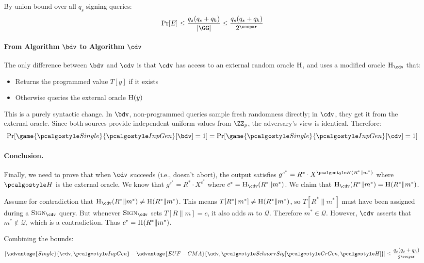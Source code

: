 \begin{mysolution}
  By union bound over all $q_s$ signing queries:
  \[
    \Pr[E] \leq \frac{q_s(q_s + q_h)}{|\GG|} \leq \frac{q_s(q_s + q_h)}{2^\secpar}
  \]

  \paragraph{From Algorithm $\bdv$ to Algorithm $\cdv$}
  The only difference between $\bdv$ and $\cdv$ is that $\cdv$ has access to an external random oracle ${\normalfont\textsc{H}}$, and uses a modified oracle $\pcoracle{H}_{\cdv}$ that:
  \begin{itemize}
    \item Returns the programmed value $T[y]$ if it exists
    \item Otherwise queries the external oracle ${\normalfont\textsc{H}}(y)$
  \end{itemize}

  This is a purely syntactic change. In $\bdv$, non-programmed queries sample fresh randomness directly; in $\cdv$, they get it from the external oracle.
  Since both sources provide independent uniform values from $\ZZ_p$, the adversary's view is identical. Therefore:
  \[
    \Pr[\game{\algo{Single}}{\algo{InpGen}}[\bdv] = 1] = \Pr[\game{\algo{Single}}{\algo{InpGen}}[\cdv] = 1]
  \]

  \paragraph{Conclusion.}
  Finally, we need to prove that when $\cdv$ succeeds (i.e., doesn't abort), the output satisfies $g^{s^*} = R^* \cdot X^{\algo{H}(R^* \| m^*)}$ where $\algo{H}$ is the external oracle. We know that $g^{s^*} = R^* \cdot X^{c^*}$ where $c^* = \pcoracle{H}_{\cdv}(R^* \| m^*)$. We claim that $\pcoracle{H}_{\cdv}(R^* \| m^*) = \pcoracle{H}(R^* \| m^*)$.
  
  Assume for contradiction that $\pcoracle{H}_{\cdv}(R^* \| m^*) \neq \pcoracle{H}(R^* \| m^*)$. This means $T[R^* \| m^*] \neq {\normalfont\textsc{H}}(R^* \| m^*)$, so $T[R^* \| m^*]$ must have been assigned during a $\pcoracle{Sign}_{\cdv}$ query. But whenever $\pcoracle{Sign}_{\cdv}$ sets $T[R \| m] = c$, it also adds $m$ to $\mathcal{Q}$. Therefore $m^* \in \mathcal{Q}$. However, $\cdv$ asserts that $m^* \notin \mathcal{Q}$, which is a contradiction. Thus $c^* = {\normalfont\textsc{H}}(R^* \| m^*)$.
  
  Combining the bounds:
  \[
    \left|\advantage{Single}{\cdv, \algo{InpGen}} - \advantage{EUF-CMA}{\adv, \algo{SchnorrSig}[\grgen, \algo{H}]}\right| \leq \frac{q_s(q_s + q_h)}{2^\secpar}
  \]

\end{mysolution}
\fi

